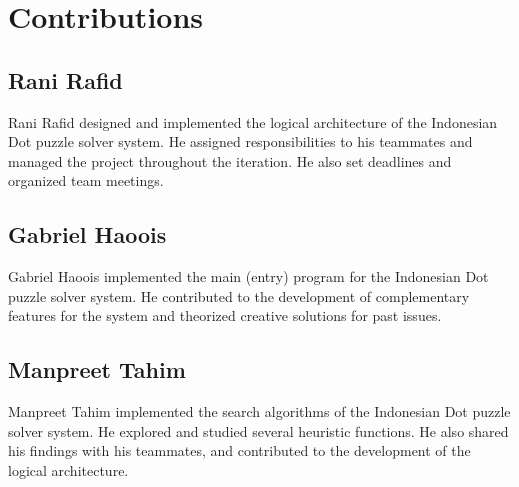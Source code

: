 \section{Contributions}

\subsection{Rani Rafid}

Rani Rafid designed and implemented the logical architecture of the Indonesian Dot puzzle solver system. He assigned responsibilities to his teammates and managed the project throughout the iteration. He also set deadlines and organized team meetings.

\subsection{Gabriel Haoois}

Gabriel Haoois implemented the main (entry) program for the Indonesian Dot puzzle solver system. He contributed to the development of complementary features for the system and theorized creative solutions for past issues.


\subsection{Manpreet Tahim}

Manpreet Tahim implemented the search algorithms of the Indonesian Dot puzzle solver system. He explored and studied several heuristic functions. He also shared his findings with his teammates, and contributed to the development of the logical architecture.

